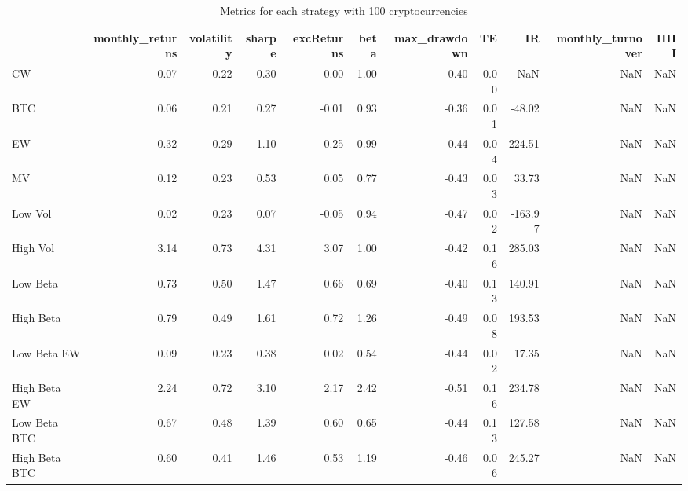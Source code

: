 \begin{table}
\centering
\caption{Metrics for each strategy with 100 cryptocurrencies}
\label{metrics100}
\begin{tabular}{lrrrrrrrrrr}
\toprule
{} &  monthly\_returns &  volatility &  sharpe &  excReturns &  beta &  max\_drawdown &   TE &      IR &  monthly\_turnover &  HHI \\
\midrule
CW            &             0.07 &        0.22 &    0.30 &        0.00 &  1.00 &         -0.40 & 0.00 &     NaN &               NaN &  NaN \\
BTC           &             0.06 &        0.21 &    0.27 &       -0.01 &  0.93 &         -0.36 & 0.01 &  -48.02 &               NaN &  NaN \\
EW            &             0.32 &        0.29 &    1.10 &        0.25 &  0.99 &         -0.44 & 0.04 &  224.51 &               NaN &  NaN \\
MV            &             0.12 &        0.23 &    0.53 &        0.05 &  0.77 &         -0.43 & 0.03 &   33.73 &               NaN &  NaN \\
Low Vol       &             0.02 &        0.23 &    0.07 &       -0.05 &  0.94 &         -0.47 & 0.02 & -163.97 &               NaN &  NaN \\
High Vol      &             3.14 &        0.73 &    4.31 &        3.07 &  1.00 &         -0.42 & 0.16 &  285.03 &               NaN &  NaN \\
Low Beta      &             0.73 &        0.50 &    1.47 &        0.66 &  0.69 &         -0.40 & 0.13 &  140.91 &               NaN &  NaN \\
High Beta     &             0.79 &        0.49 &    1.61 &        0.72 &  1.26 &         -0.49 & 0.08 &  193.53 &               NaN &  NaN \\
Low Beta EW   &             0.09 &        0.23 &    0.38 &        0.02 &  0.54 &         -0.44 & 0.02 &   17.35 &               NaN &  NaN \\
High Beta EW  &             2.24 &        0.72 &    3.10 &        2.17 &  2.42 &         -0.51 & 0.16 &  234.78 &               NaN &  NaN \\
Low Beta BTC  &             0.67 &        0.48 &    1.39 &        0.60 &  0.65 &         -0.44 & 0.13 &  127.58 &               NaN &  NaN \\
High Beta BTC &             0.60 &        0.41 &    1.46 &        0.53 &  1.19 &         -0.46 & 0.06 &  245.27 &               NaN &  NaN \\
\bottomrule
\end{tabular}
\end{table}
